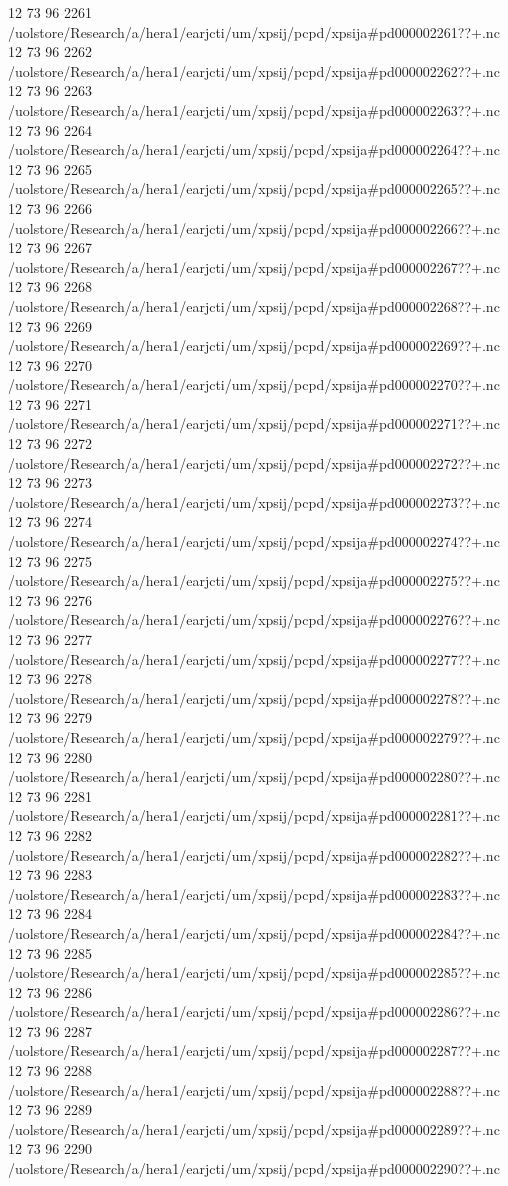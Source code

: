 12 73 96
2261
/uolstore/Research/a/hera1/earjcti/um/xpsij/pcpd/xpsija#pd000002261??+.nc
12 73 96
2262
/uolstore/Research/a/hera1/earjcti/um/xpsij/pcpd/xpsija#pd000002262??+.nc
12 73 96
2263
/uolstore/Research/a/hera1/earjcti/um/xpsij/pcpd/xpsija#pd000002263??+.nc
12 73 96
2264
/uolstore/Research/a/hera1/earjcti/um/xpsij/pcpd/xpsija#pd000002264??+.nc
12 73 96
2265
/uolstore/Research/a/hera1/earjcti/um/xpsij/pcpd/xpsija#pd000002265??+.nc
12 73 96
2266
/uolstore/Research/a/hera1/earjcti/um/xpsij/pcpd/xpsija#pd000002266??+.nc
12 73 96
2267
/uolstore/Research/a/hera1/earjcti/um/xpsij/pcpd/xpsija#pd000002267??+.nc
12 73 96
2268
/uolstore/Research/a/hera1/earjcti/um/xpsij/pcpd/xpsija#pd000002268??+.nc
12 73 96
2269
/uolstore/Research/a/hera1/earjcti/um/xpsij/pcpd/xpsija#pd000002269??+.nc
12 73 96
2270
/uolstore/Research/a/hera1/earjcti/um/xpsij/pcpd/xpsija#pd000002270??+.nc
12 73 96
2271
/uolstore/Research/a/hera1/earjcti/um/xpsij/pcpd/xpsija#pd000002271??+.nc
12 73 96
2272
/uolstore/Research/a/hera1/earjcti/um/xpsij/pcpd/xpsija#pd000002272??+.nc
12 73 96
2273
/uolstore/Research/a/hera1/earjcti/um/xpsij/pcpd/xpsija#pd000002273??+.nc
12 73 96
2274
/uolstore/Research/a/hera1/earjcti/um/xpsij/pcpd/xpsija#pd000002274??+.nc
12 73 96
2275
/uolstore/Research/a/hera1/earjcti/um/xpsij/pcpd/xpsija#pd000002275??+.nc
12 73 96
2276
/uolstore/Research/a/hera1/earjcti/um/xpsij/pcpd/xpsija#pd000002276??+.nc
12 73 96
2277
/uolstore/Research/a/hera1/earjcti/um/xpsij/pcpd/xpsija#pd000002277??+.nc
12 73 96
2278
/uolstore/Research/a/hera1/earjcti/um/xpsij/pcpd/xpsija#pd000002278??+.nc
12 73 96
2279
/uolstore/Research/a/hera1/earjcti/um/xpsij/pcpd/xpsija#pd000002279??+.nc
12 73 96
2280
/uolstore/Research/a/hera1/earjcti/um/xpsij/pcpd/xpsija#pd000002280??+.nc
12 73 96
2281
/uolstore/Research/a/hera1/earjcti/um/xpsij/pcpd/xpsija#pd000002281??+.nc
12 73 96
2282
/uolstore/Research/a/hera1/earjcti/um/xpsij/pcpd/xpsija#pd000002282??+.nc
12 73 96
2283
/uolstore/Research/a/hera1/earjcti/um/xpsij/pcpd/xpsija#pd000002283??+.nc
12 73 96
2284
/uolstore/Research/a/hera1/earjcti/um/xpsij/pcpd/xpsija#pd000002284??+.nc
12 73 96
2285
/uolstore/Research/a/hera1/earjcti/um/xpsij/pcpd/xpsija#pd000002285??+.nc
12 73 96
2286
/uolstore/Research/a/hera1/earjcti/um/xpsij/pcpd/xpsija#pd000002286??+.nc
12 73 96
2287
/uolstore/Research/a/hera1/earjcti/um/xpsij/pcpd/xpsija#pd000002287??+.nc
12 73 96
2288
/uolstore/Research/a/hera1/earjcti/um/xpsij/pcpd/xpsija#pd000002288??+.nc
12 73 96
2289
/uolstore/Research/a/hera1/earjcti/um/xpsij/pcpd/xpsija#pd000002289??+.nc
12 73 96
2290
/uolstore/Research/a/hera1/earjcti/um/xpsij/pcpd/xpsija#pd000002290??+.nc
